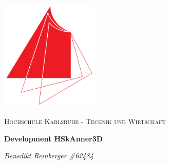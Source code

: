 \documentclass[11pt]{article}
\begin{document}
\date{}
    \begin{titlepage}
    	\centering

    	\includegraphics[width=0.35\textwidth]{images/hska_logo.png}\par\vspace{2cm}
    	{\scshape\LARGE Hochschule Karlsruhe - Technik und Wirtschaft \par}
    	\vspace{1.5cm}
    	{\huge\bfseries Development HSkAnner3D\par}
    	\vspace{2cm}
    	{\Large\itshape Benedikt Reinberger \#62484\par}
    	\vfill
    

    \end{titlepage}

\tableofcontents
\newpage







\end{document}

